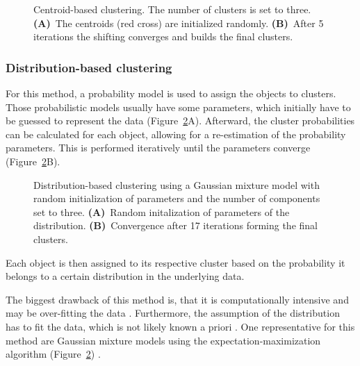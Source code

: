 \documentclass[12pt,a4paper,english]{article}
\begin{document}
   	\begin{figure}[H]
		\centering
		\vspace{-10pt}
		\def\svgwidth{\textwidth}
		
		\caption[Centroid-based clustering.]{Centroid-based clustering. The number of clusters is set to three. \textbf{(A)}~The centroids (red cross) are initialized randomly. \textbf{(B)}~After 5 iterations the shifting converges and builds the final clusters.}
		\label{img:centroid}
	\end{figure}

\subsubsection*{Distribution-based clustering}
    For this method, a probability model is used to assign the objects to clusters. Those probabilistic models usually have some parameters, which initially have to be guessed to represent the data (Figure~\ref{img:distribution}A). Afterward, the cluster probabilities can be calculated for each object, allowing for a re-estimation of the probability parameters. This is performed iteratively until the parameters converge (Figure~\ref{img:distribution}B).
    	\begin{figure}[H]
    	\centering
		\vspace{-10pt}
    	\def\svgwidth{\textwidth}
    	
    	\caption[Distribution-based clustering.]{Distribution-based clustering using a Gaussian mixture model with random initialization of parameters and the number of components set to three. \textbf{(A)}~Random initalization of parameters of the distribution. \textbf{(B)}~Convergence after 17 iterations forming the final clusters.}
    	\label{img:distribution}
    \end{figure}
    
	Each object is then assigned to its respective cluster based on the probability it belongs to a certain distribution in the underlying data.

	The biggest drawback of this method is, that it is computationally intensive and may be over-fitting the data \citep{distribution-based:04}. Furthermore, the assumption of the distribution has to fit the data, which is not likely known a priori \citep{distribution-based:03}. One representative for this method are Gaussian mixture models using the expectation-maximization algorithm (Figure~\ref{img:distribution}) \citep{distribution-based:ex-max:09}.
\end{document}
